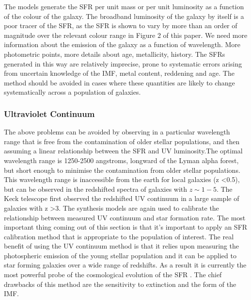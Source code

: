 \documentclass{literature}
\begin{document}
The models generate the SFR per unit mass or per unit luminosity as a function of the colour of the galaxy. The broadband luminosity of the galaxy by itself is a poor tracer of the SFR, as the SFR is shown to vary by more than an order of magnitude over the relevant colour range in Figure 2 of this paper. We need more information about the emission of the galaxy as a function of wavelength. More photometric points, more details about age, metallicity, history. The SFRs generated in this way are relatively imprecise, prone to systematic errors arising from uncertain knowledge of the IMF, metal content, reddening and age. The method should be avoided in cases where these quantities are likely to change systematically across a population of galaxies. \\ 
\subsubsection{Ultraviolet Continuum}   
The above problems can be avoided by observing in a particular wavelength range that is free from the contamination of older stellar populations, and then assuming a linear relationship between the SFR and UV luminosity.The optimal wavelength range is 1250-2500 angstroms, longward of the Lyman alpha forest, but short enough to minimise the contamination from older stellar populations. This wavelength range is inaccessible from the earth for local galaxies (z   \textless 0.5), but can be observed in the redshifted spectra of galaxies with $z \sim 1-5$. The Keck telescope first observed the redshifted UV continuum in a large sample of galaxies with z \textgreater 3. The synthesis models are again used to calibrate the relationship between measured UV continuum and star formation rate. The most important thing coming out of this section is that it's important to apply an SFR calibration method that is appropriate to the population of interest. The real benefit of using the UV continuum method is that it relies upon measuring the photospheric emission of the young stellar population and it can be applied to star forming galaxies over a wide range of redshifts. As a result it is currently the most powerful probe of the cosmological evolution of the SFR \citep{Madau1996}. The chief drawbacks of this method are the sensitivity to extinction and the form of the IMF.
\end{document}
